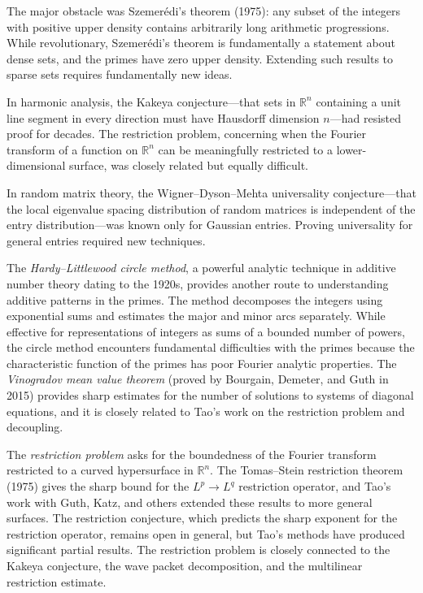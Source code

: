 The major obstacle was Szemer\'edi's theorem (1975): any subset of the integers with positive upper density contains arbitrarily long arithmetic progressions. While revolutionary, Szemer\'edi's theorem is fundamentally a statement about dense sets, and the primes have zero upper density. Extending such results to sparse sets requires fundamentally new ideas.

In harmonic analysis, the Kakeya conjecture---that sets in $\mathbb{R}^n$ containing a unit line segment in every direction must have Hausdorff dimension $n$---had resisted proof for decades. The restriction problem, concerning when the Fourier transform of a function on $\mathbb{R}^n$ can be meaningfully restricted to a lower-dimensional surface, was closely related but equally difficult.

In random matrix theory, the Wigner--Dyson--Mehta universality conjecture---that the local eigenvalue spacing distribution of random matrices is independent of the entry distribution---was known only for Gaussian entries. Proving universality for general entries required new techniques.

The \emph{Hardy--Littlewood circle method}, a powerful analytic technique in additive number theory dating to the 1920s, provides another route to understanding additive patterns in the primes. The method decomposes the integers using exponential sums and estimates the major and minor arcs separately. While effective for representations of integers as sums of a bounded number of powers, the circle method encounters fundamental difficulties with the primes because the characteristic function of the primes has poor Fourier analytic properties. The \emph{Vinogradov mean value theorem} (proved by Bourgain, Demeter, and Guth in 2015) provides sharp estimates for the number of solutions to systems of diagonal equations, and it is closely related to Tao's work on the restriction problem and decoupling.

The \emph{restriction problem} asks for the boundedness of the Fourier transform restricted to a curved hypersurface in $\mathbb{R}^n$. The Tomas--Stein restriction theorem (1975) gives the sharp bound for the $L^p \to L^q$ restriction operator, and Tao's work with Guth, Katz, and others extended these results to more general surfaces. The restriction conjecture, which predicts the sharp exponent for the restriction operator, remains open in general, but Tao's methods have produced significant partial results. The restriction problem is closely connected to the Kakeya conjecture, the wave packet decomposition, and the multilinear restriction estimate.

